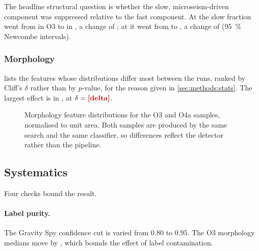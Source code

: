 The headline structural question is whether the slow, microseism-driven
component was suppressed relative to the fast component. At \Hone{} the slow
fraction went from \ResultSlowFractionOThreeHOne{} in O3 to
\ResultSlowFractionOFouraHOne{} in \Ofa, a change of
\ResultSlowShiftHOne{}; at \Lone{} it went from
\ResultSlowFractionOThreeLOne{} to \ResultSlowFractionOFouraLOne{}, a change of
\ResultSlowShiftLOne{} (\SI{95}{\percent} Newcombe intervals).

\subsubsection{Morphology}

 lists the features whose distributions differ most
between the runs, ranked by Cliff's $\delta$ rather than by $p$-value, for the
reason given in \cref{sec:methods:stats}. The largest effect is in
\ResultStrongestFeature{}, at $\delta = \ResultStrongestDelta$.

\begin{table}[htbp]
\centering
\caption{Feature-by-feature comparison, ranked by effect size. $p$-values are
Benjamini--Hochberg corrected across all twenty features. Full table in
.}
\label{tab:featurecomp}
\small
{}
\end{table}

\begin{figure}[htbp]
\centering
{}
\caption{Morphology feature distributions for the O3 and O4a samples,
normalised to unit area. Both samples are produced by the same search and the
same classifier, so differences reflect the detector rather than the pipeline.}
\label{fig:featuredist}
\end{figure}

\subsection{Systematics}
\label{sec:results:systematics}

Four checks bound the result.

\paragraph{Label purity.} The Gravity Spy confidence cut is varied from
$0.80$ to $0.95$. The O3 morphology medians move by , which
bounds the effect of label contamination.

